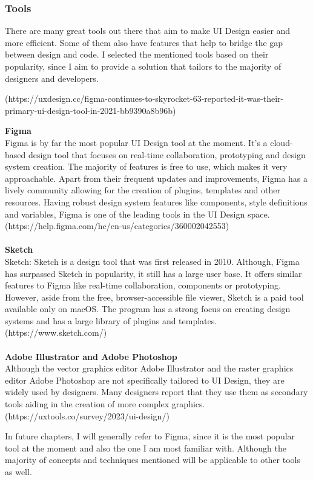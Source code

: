 \subsubsection{Tools}
There are many great tools out there that aim to make UI Design easier and more efficient. Some of
them also have features that help to bridge the gap between design and code. I selected the
mentioned tools based on their popularity, since I aim to provide a solution that tailors to the
majority of designers and developers.

(https://uxdesign.cc/figma-continues-to-skyrocket-63-reported-it-was-their-primary-ui-design-tool-in-2021-bb9390a8b96b)

\textbf{Figma}\\
Figma is by far the most popular UI Design tool at the moment. It's a cloud-based design tool
that focuses on real-time collaboration, prototyping and design system creation. The majority of
features is free to use, which makes it very approachable. Apart from their frequent updates and
improvements, Figma has a lively community allowing for the creation of plugins, templates and other
resources. Having robust design system features like components, style definitions and variables,
Figma is one of the leading tools in the UI Design space.
(https://help.figma.com/hc/en-us/categories/360002042553)\\\\
\textbf{Sketch}\\
Sketch: Sketch is a design tool that was first released in 2010. Although, Figma has surpassed
Sketch in popularity, it still has a large user base. It offers similar features to Figma like
real-time collaboration, components or prototyping. However, aside from the free, browser-accessible
file viewer, Sketch is a paid tool available only on macOS. The program has a strong focus on
creating design systems and has a large library of plugins and templates.
(https://www.sketch.com/)\\\\
\textbf{Adobe Illustrator and Adobe Photoshop}\\
Although the vector graphics editor Adobe Illustrator and the raster graphics editor Adobe Photoshop
are not specifically tailored to UI Design, they are widely used by designers. Many designers report
that they use them as secondary tools aiding in the creation of more complex graphics. (https://uxtools.co/survey/2023/ui-design/)

In future chapters, I will generally refer to Figma, since it is the most popular tool at the moment
and also the one I am most familiar with. Although the majority of concepts and techniques mentioned
will be applicable to other tools as well.

